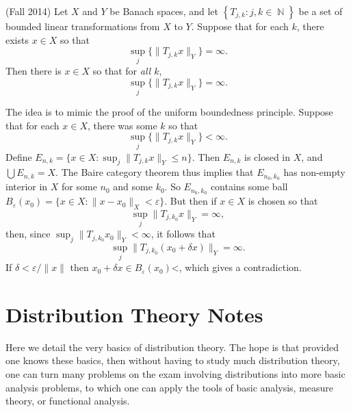 \documentclass[answers]{exam}
\DeclareMathOperator{\NN}{\mathbb{N}}
\begin{document}
\begin{questions}
\item (Fall 2014)
	Let $X$ and $Y$ be Banach spaces, and let $\left\{ T_{j,k}: j,k\in \NN \right\}$ be a set of bounded linear transformations from $X$ to $Y$. Suppose that for each $k$, there exists $x \in X$ so that
	\[ \sup_j \{ \| T_{j,k} x \|_Y \} = \infty. \]
	Then there is $x \in X$ so that for \emph{all $k$},
	\[ \sup_j \{ \| T_{j,k} x \|_Y \} = \infty. \]
  \begin{solution}
  	The idea is to mimic the proof of the uniform boundedness principle. Suppose that for each $x \in X$, there was some $k$ so that
  	\[ \sup_j \{ \| T_{j,k} x \|_Y \} < \infty. \]
  	Define $E_{n,k} = \{ x \in X: \sup_j \| T_{j,k} x \|_Y \leq n \}$. Then $E_{n,k}$ is closed in $X$, and $\bigcup E_{n,k} = X$. The Baire category theorem thus implies that $E_{n_0,k_0}$ has non-empty interior in $X$ for some $n_0$ and some $k_0$. So $E_{n_0,k_0}$ contains some ball $B_\varepsilon(x_0) = \{ x \in X: \| x - x_0 \|_X < \varepsilon \}$. But then if $x \in X$ is chosen so that
  	\[ \sup_j \| T_{j,k_0} x \|_Y = \infty, \]
  	then, since $\sup_j \| T_{j,k_0} x_0 \|_Y < \infty$, it follows that
  	\[ \sup_j \| T_{j,k_0} (x_0 + \delta x ) \|_Y = \infty. \]
  	If $\delta < \varepsilon / \| x \|$ then $x_0 + \delta x \in B_\varepsilon(x_0)$<, which gives a contradiction.
\end{solution}







\newpage
\section{Distribution Theory Notes}

Here we detail the very basics of distribution theory. The hope is that provided one knows these basics, then without having to study much distribution theory, one can turn many problems on the exam involving distributions into more basic analysis problems, to which one can apply the tools of basic analysis, measure theory, or functional analysis.


\end{questions}
\end{document}
